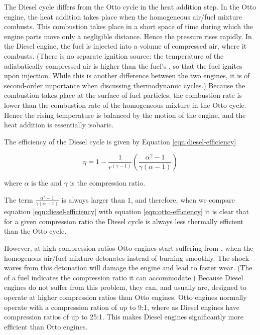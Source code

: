 The Diesel cycle differs from the Otto cycle in the heat addition step. In the
Otto engine, the heat addition takes place when the homogeneous air/fuel mixture
combusts. This combustion takes place in a short space of time during which the
engine parts move only a negligible distance. Hence the pressure rises rapidly.
In the Diesel engine, the fuel is injected into a volume of compressed air,
where it combusts. (There is no separate ignition source: the temperature of the
adiabatically compressed air is higher than the fuel's , so that the fuel ignites upon injection. While this is another
difference between the two engines, it is of second-order importance when
discussing thermodynamic cycles.) Because the combustion takes place at the
surface of fuel particles, the combustion rate is lower than the combustion rate
of the homogeneous mixture in the Otto cycle. Hence the rising temperature is
balanced by the motion of the engine, and the heat addition is essentially
isobaric.

The efficiency of the Diesel cycle is given by Equation \ref{eqn:diesel-efficiency}

\begin{equation}
	\eta = 1 - \frac{1}{r^{(\gamma - 1 )}}(\frac{\alpha^{\gamma}-1}{\gamma(\alpha-1)})
\label{eqn:diesel-efficiency}
\end{equation}
 
where \(\alpha\) is the  and \(\gamma\) is the compression ratio.

The term \( \frac{\alpha^{\gamma}-1}{\gamma(\alpha-1)} \) is always larger
than \(1 \), and therefore, when we compare equation \ref{eqn:diesel-efficiency}
with equation \ref{eqn:otto-efficiency} it is clear that for a given
compression ratio the Diesel cycle is always less thermally efficient than the
Otto cycle. 

However, at high compression ratios Otto engines start suffering from
, when the homogenous air/fuel mixture detonates instead of
burning smoothly. The shock waves from this detonation will damage the engine
and lead to faster wear. (The  of a fuel indicates the
compression ratio it can accommodate.) Because Diesel engines do not suffer from
this problem, they can, and usually are, designed to operate at higher
compression ratios than Otto engines.  Otto engines normally operate with a
compression ration of up to 9:1, where as Diesel engines have compression ratios
of up to 25:1. This makes Diesel engines significantly more efficient than Otto
engines.

